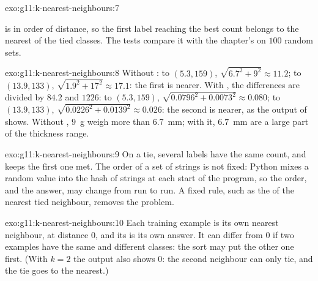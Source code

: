 \begin{solution}{exo:g11:k-nearest-neighbours:7}
\smallskip\noindent\hspace*{2em}

\noindent\hspace*{4em}

\noindent\hspace*{4em}

\noindent\hspace*{4em}

\noindent\hspace*{4em}

\smallskip\noindent {} is in order of distance, so the first label reaching the best count belongs to the
nearest of the tied classes. The tests compare it with the chapter's  on $100$ random sets.
\end{solution}

\begin{solution}{exo:g11:k-nearest-neighbours:8}
Without : to $(5.3, 159)$, $\sqrt{6.7^2 + 9^2} \approx 11.2$; to $(13.9, 133)$, $\sqrt{1.9^2 + 17^2} \approx
17.1$: the first is nearer. With , the differences are divided by $84.2$ and $1226$: to $(5.3, 159)$,
$\sqrt{0.0796^2 + 0.0073^2} \approx 0.080$; to $(13.9, 133)$, $\sqrt{0.0226^2 + 0.0139^2} \approx 0.026$: the second is
nearer, as the output of  shows. Without , $9$~g weigh more than $6.7$~mm; with it, $6.7$~mm
are a large part of the thickness range.
\end{solution}

\begin{solution}{exo:g11:k-nearest-neighbours:9}
On a tie, several labels have the same count, and  keeps the first one met. The order of a set of strings is
not fixed: Python mixes a random value into the hash of strings at each start of the program, so the order, and the
answer, may change from run to run. A fixed rule, such as the  of the nearest tied neighbour, removes the
problem.
\end{solution}

\begin{solution}{exo:g11:k-nearest-neighbours:10}
Each training example is its own nearest neighbour, at distance $0$, and its  is its own answer. It can differ
from $0$ if two examples have the same  and different classes: the sort may put the other one first. (With
$k = 2$ the output also shows $0$: the second neighbour can only tie, and the tie goes to the nearest.)
\end{solution}

